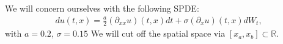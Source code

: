 We will concern ourselves with the following SPDE:
\begin{align*}
	 du(t,x)= \frac{a}{2} (\partial_{xx}u)(t,x) dt+ \sigma (\partial_{x}u)(t,x) dW_t,
\end{align*}
with $a=0.2$, $\sigma=0.15$
We will cut off the spatial space via $[x_a,x_b]\subset \mathbb{R}.$
